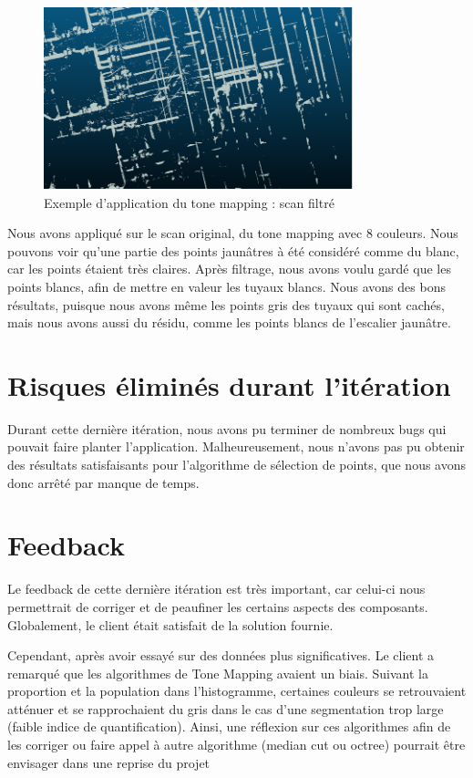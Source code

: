 \documentclass[12pt,titlepage,french]{article}
\begin{document}
\begin{figure}[H]
 \caption{\label{}  Exemple d'application du tone mapping : scan filtré}
 \begin{center}
 \includegraphics[width=0.8\textwidth]{./img/tm_example_3.PNG}
  \end{center}
\end{figure}

Nous avons appliqué sur le scan original, du tone mapping avec 8 couleurs. Nous pouvons voir qu'une partie des points jaunâtres à été considéré comme du blanc, car les points étaient très claires. Après filtrage, nous avons voulu gardé que les points blancs, afin de mettre en valeur les tuyaux blancs. Nous avons des bons résultats, puisque nous avons même les points gris des tuyaux qui sont cachés, mais nous avons aussi du résidu, comme les points blancs de l'escalier jaunâtre.

\section{Risques éliminés durant l'itération}

Durant cette dernière itération, nous avons pu terminer de nombreux bugs qui pouvait faire planter l'application. Malheureusement, nous n'avons pas pu obtenir des résultats satisfaisants pour l'algorithme de sélection de points, que nous avons donc arrêté par manque de temps.

\section{Feedback}

Le feedback de cette dernière itération est très important, car celui-ci nous permettrait de corriger et de peaufiner les certains aspects des composants. Globalement, le client était satisfait de la solution fournie.

Cependant, après avoir essayé sur des données plus significatives.
Le client a remarqué que les algorithmes de Tone Mapping avaient un biais.
Suivant la proportion et la population dans l'histogramme, certaines couleurs se retrouvaient atténuer et se rapprochaient du gris dans le cas d'une segmentation trop large (faible indice de quantification).
Ainsi, une réflexion sur ces algorithmes afin de les corriger ou faire appel à autre algorithme (median cut ou octree) pourrait être envisager dans une reprise du projet
\end{document}
